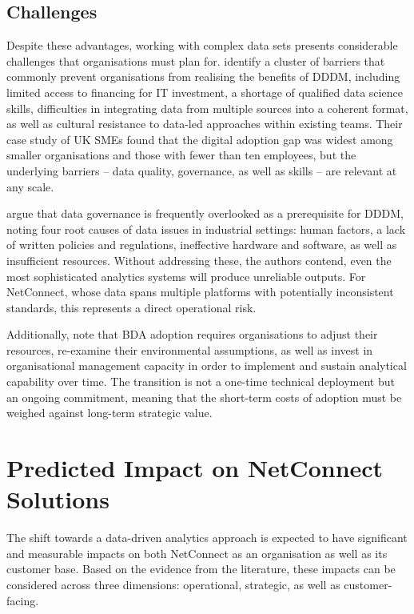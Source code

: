 \documentclass[12pt,a4paper]{article}
\begin{document}
\subsection{Challenges}

Despite these advantages, working with complex data sets presents considerable challenges that organisations must plan for. \textcite{Tawil2023} identify a cluster of barriers that commonly prevent organisations from realising the benefits of DDDM, including limited access to financing for IT investment, a shortage of qualified data science skills, difficulties in integrating data from multiple sources into a coherent format, as well as cultural resistance to data-led approaches within existing teams. Their case study of UK SMEs found that the digital adoption gap was widest among smaller organisations and those with fewer than ten employees, but the underlying barriers -- data quality, governance, as well as skills -- are relevant at any scale.

\textcite{Li2024} argue that data governance is frequently overlooked as a prerequisite for DDDM, noting four root causes of data issues in industrial settings: human factors, a lack of written policies and regulations, ineffective hardware and software, as well as insufficient resources. Without addressing these, the authors contend, even the most sophisticated analytics systems will produce unreliable outputs. For NetConnect, whose data spans multiple platforms with potentially inconsistent standards, this represents a direct operational risk.

Additionally, \textcite{Sabharwal2021} note that BDA adoption requires organisations to adjust their resources, re-examine their environmental assumptions, as well as invest in organisational management capacity in order to implement and sustain analytical capability over time. The transition is not a one-time technical deployment but an ongoing commitment, meaning that the short-term costs of adoption must be weighed against long-term strategic value.

\newpage
\section{Predicted Impact on NetConnect Solutions}

The shift towards a data-driven analytics approach is expected to have significant and measurable impacts on both NetConnect as an organisation as well as its customer base. Based on the evidence from the literature, these impacts can be considered across three dimensions: operational, strategic, as well as customer-facing.
\end{document}
